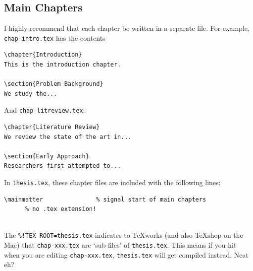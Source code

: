 \documentclass[a4paper,12pt]{scrartcl}
\begin{document}
\subsection{Main Chapters}\label{sec:chapters}

I highly recommend that each chapter be written in a separate file. For example, \texttt{chap-intro.tex} has the contents

\begin{lstlisting}[moretexcs={chapter}]
%!TEX ROOT=thesis.tex
\chapter{Introduction}
This is the introduction chapter.

\section{Problem Background}
We study the...
\end{lstlisting}

\bigskip

And \texttt{chap-litreview.tex}:
\begin{lstlisting}[moretexcs={chapter}]
%!TEX ROOT=thesis.tex
\chapter{Literature Review}
We review the state of the art in...

\section{Early Approach}
Researchers first attempted to...
\end{lstlisting}

\bigskip

In \texttt{thesis.tex}, these chapter files are included with the following lines:
\begin{lstlisting}[keepspaces=true,moretexcs=mainmatter]
\mainmatter               % signal start of main chapters
      % no .tex extension!


\end{lstlisting}

\bigskip

The \lstinline|%!TEX ROOT=thesis.tex| indicates to \textsf{TeXworks} (and also \textsf{TeXshop} on the Mac) that \texttt{chap-xxx.tex} are `sub-files' of \texttt{thesis.tex}. This means if you hit  when you  are editing \texttt{chap-xxx.tex}, \texttt{thesis.tex} will get compiled instead. Neat eh?
\end{document}
